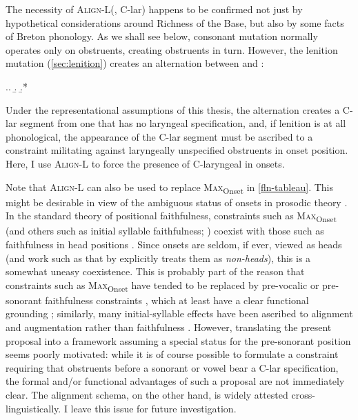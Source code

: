 The necessity of \textsc{Align-L}(\sy, C-lar) happens to be confirmed not just by hypothetical considerations around Richness of the Base, but also by some facts of Breton phonology. As we shall see below, consonant mutation normally operates only on obstruents, creating obstruents in turn. However, the lenition mutation (\cref{sec:lenition}) creates an alternation between \ipa{[m]}  and \ipa{[v]}:

\ex.\a.
\b.
\b.*

Under the representational assumptions of this thesis, the alternation creates a C-lar segment from one that has no laryngeal specification, and, if lenition is at all phonological, the appearance of the C-lar segment must be ascribed to a constraint militating against laryngeally unspecified obstruents in onset position. Here, I use \textsc{Align-L} to force the presence of C-laryngeal in onsets.

Note that \textsc{Align-L} can also be used to replace \textsc{Max}\textsubscript{Onset} in \cref{fln-tableau}. This might be desirable in view of the ambiguous status of onsets in prosodic theory \citep[\cfm][chap.~7]{topintzi10:_onset}. In the standard theory of positional faithfulness, constraints such as \textsc{Max}\textsubscript{Onset} (and others such as  initial syllable faithfulness; \citealt{steriade94:_posit,beckman97:_posit_shona,beckman,casali98:_resol,barnesbook,becker09:_phonol,becker11:_surfeit_stimul,beckerng:_asymm_gener_alter_initial_syllab}) coexist with those such as faithfulness in head positions \citep[\egm][]{beckman,alderete1999}. Since onsets are seldom, if ever, viewed as heads (and work such as that by \citealp{smith12:_korean} explicitly treats them as \emph{non\hyp heads}), this is a somewhat uneasy coexistence. This is probably part of the reason that constraints such as \textsc{Max}\textsubscript{Onset} have tended to be replaced by pre\hyp vocalic or pre\hyp sonorant faithfulness constraints \citep{rubach08:_prevoc,beckman09:_german,jurgec10:_featur_spread}, which at least have a clear functional grounding \citep{steriade94:_posit,steriade01}; similarly, many initial\hyp syllable effects have been ascribed to alignment and augmentation rather than faithfulness \citep{zoll97:_confl,zoll1998,walker2000,smith-diss,smith04:_makin,teeple09:_bicon}. However, translating the present proposal into a framework assuming a special status for the pre\hyp sonorant position seems poorly motivated: while it is of course possible to formulate a constraint requiring that obstruents before a sonorant or vowel bear a C-lar specification, the formal and\fshyp or functional advantages of such a proposal are not immediately clear. The alignment schema, on the other hand, is widely attested cross\hyp linguistically. I leave this issue for future investigation.

